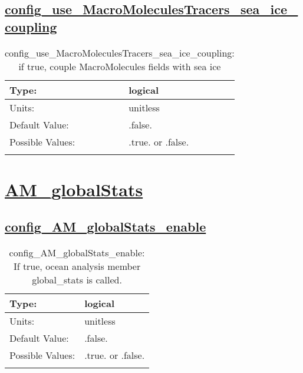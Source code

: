 \subsection[config\_use\_MacroMoleculesTracers\_sea\_ice\_coupling]{\hyperref[sec:nm_tab_tracer_forcing_MacroMoleculesTracers]{config\_use\_MacroMoleculesTracers\_sea\_ice\_coupling}}
\label{subsec:nm_sec_config_use_MacroMoleculesTracers_sea_ice_coupling}
\begin{center}
\begin{longtable}{| p{2.0in} || p{4.0in} |}
    \hline
    Type: & logical \\
    \hline
    Units: & \si{unitless} \\
    \hline
    Default Value: & .false. \\
    \hline
    Possible Values: & .true. or .false. \\
    \hline
    \caption{config\_use\_MacroMoleculesTracers\_sea\_ice\_coupling: if true, couple MacroMolecules fields with sea ice}
\end{longtable}
\end{center}
\section[AM\_globalStats]{\hyperref[sec:nm_tab_AM_globalStats]{AM\_globalStats}}
\label{sec:nm_sec_AM_globalStats}
\subsection[config\_AM\_globalStats\_enable]{\hyperref[sec:nm_tab_AM_globalStats]{config\_AM\_globalStats\_enable}}
\label{subsec:nm_sec_config_AM_globalStats_enable}
\begin{center}
\begin{longtable}{| p{2.0in} || p{4.0in} |}
    \hline
    Type: & logical \\
    \hline
    Units: & \si{unitless} \\
    \hline
    Default Value: & .false. \\
    \hline
    Possible Values: & .true. or .false. \\
    \hline
    \caption{config\_AM\_globalStats\_enable: If true, ocean analysis member global\_stats is called.}
\end{longtable}
\end{center}
